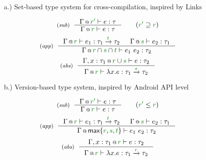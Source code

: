 \begin{figure}[t]

{\small a.) Set-based type system for cross-compilation, inspired by Links \cite{app-distributed-links}}

\begin{equation*}
\tyrule{sub}
  {\coctx{\Gamma}{\cclrd{r'}} \vdash e : \tau }
  {\coctx{\Gamma}{\cclrd{r}} \vdash e : \tau }\quad\quad(\cclrd{r'} \supseteq \cclrd{r})
\end{equation*}
\begin{equation*}
\tyrule{app}
  {\coctx{\Gamma}{\cclrd{r}} \vdash e_1 : \tau_1 \xrightarrow{\cclrd{t}} \tau_2 &
   \coctx{\Gamma}{\cclrd{s}} \vdash e_2 : \tau_1 }
  {\coctx{\Gamma}{\cclrd{r} \cap \cclrd{s} \cap \cclrd{t}} \vdash e_1~e_2 : \tau_2}
\end{equation*}
\begin{equation*}
\tyrule{abs}
  {\coctx{\Gamma, x:\tau_1}{\cclrd{r} \cup \cclrd{s}} \vdash e : \tau_2}
  {\coctx{\Gamma}{\cclrd{r}} \vdash \lambda x.e : \tau_1 \xrightarrow{\cclrd{s}} \tau_2 }
\end{equation*}
\vspace{0.5em}

{\small b.) Version-based type system, inspired by Android API level \cite{app-android-multitarget}}

\begin{equation*}
\tyrule{sub}
  {\coctx{\Gamma}{\cclrd{r'}} \vdash e : \tau }
  {\coctx{\Gamma}{\cclrd{r}} \vdash e : \tau }\quad\quad(\cclrd{r'} \leq \cclrd{r})
\end{equation*}
\begin{equation*}
\tyrule{app}
  {\coctx{\Gamma}{\cclrd{r}} \vdash e_1 : \tau_1 \xrightarrow{\cclrd{t}} \tau_2 &
   \coctx{\Gamma}{\cclrd{s}} \vdash e_2 : \tau_1 }
  {\coctx{\Gamma}{\ident{max} \{\cclrd{r}, \cclrd{s}, \cclrd{t} \}} \vdash e_1~e_2 : \tau_2}
\end{equation*}
\begin{equation*}
\tyrule{abs}
  {\coctx{\Gamma, x:\tau_1}{\cclrd{r}} \vdash e : \tau_2}
  {\coctx{\Gamma}{\cclrd{r}} \vdash \lambda x.e : \tau_1 \xrightarrow{\cclrd{r}} \tau_2 }
\end{equation*}

\label{fig:applications-flat-cross}
\vspace{-1em}
\end{figure}


